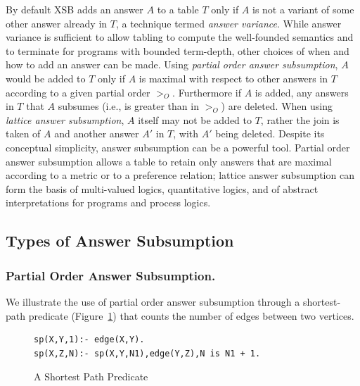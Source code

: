 %
By default XSB adds an answer $A$ to a table $T$ only if $A$ is not a
variant of some other answer already in $T$, a technique termed {\em
  answer variance}.  While answer variance is sufficient to allow
tabling to compute the well-founded semantics and to terminate for
programs with bounded term-depth, other choices of when and how to add
an answer can be made.  Using {\em partial order answer subsumption},
$A$ would be added to $T$ only if $A$ is maximal with respect to other
answers in $T$ according to a given partial order $>_O$. Furthermore
if $A$ is added, any answers in $T$ that $A$ subsumes (i.e., is
greater than in $>_O$) are deleted.  When using {\em lattice answer
  subsumption}, $A$ itself may not be added to $T$, rather the join is
taken of $A$ and another answer $A'$ in $T$, with $A'$ being deleted.
Despite its conceptual simplicity, answer subsumption can be a
powerful tool.  Partial order answer subsumption allows a table to
retain only answers that are maximal according to a metric or to a
preference relation; lattice answer subsumption can form the basis of
multi-valued logics, quantitative logics, and of abstract
interpretations for programs and process logics.
%

\subsection{Types of Answer Subsumption}

\subsubsection{Partial Order Answer Subsumption.}
% 
We illustrate the use of partial order answer subsumption through a
shortest-path predicate (Figure~\ref{fig:sp-preds}) that counts the
number of edges between two vertices.
%
\begin{figure}[htb]
{\small
\begin{verbatim}
sp(X,Y,1):- edge(X,Y).
sp(X,Z,N):- sp(X,Y,N1),edge(Y,Z),N is N1 + 1.
\end{verbatim}
} 
\caption{A Shortest Path Predicate}\label{fig:sp-preds}
\end{figure}

